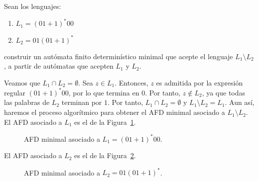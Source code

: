 \begin{ejercicio}\label{ej:1.3.15}
    Sean los lenguajes:
    \begin{enumerate}
        \item $L_1={(01+1)}^{\ast}00$
        \item $L_2=01{(01+1)}^{\ast}$
    \end{enumerate}
    construir un autómata finito determinístico minimal que acepte el lenguaje $L_1 \setminus L_2$, a partir de autómatas que acepten $L_1$ y $L_2$.

    Veamos que $L_1\cap L_2=\emptyset$. Sea $z\in L_1$. Entonces, $z$ es admitida por la expresión regular $(01+1)^{\ast}00$, por lo que termina en $0$. Por tanto, $z\notin L_2$, ya que todas las palabras de $L_2$ terminan por $1$. Por tanto, $L_1\cap L_2=\emptyset$ y $L_1\setminus L_2=L_1$. Aun así, haremos el proceso algorítmico para obtener el AFD minimal asociado a $L_1\setminus L_2$.\\

    El AFD asociado a $L_1$ es el de la Figura~\ref{fig:1.3.15-L1}.
    \begin{figure}
        \centering
        \caption{AFD minimal asociado a $L_1={(01+1)}^{\ast}00$.}
        \label{fig:1.3.15-L1}
    \end{figure}

    El AFD asociado a $L_2$ es el de la Figura~\ref{fig:1.3.15-L2}.
    \begin{figure}
        \centering
        \caption{AFD minimal asociado a $L_2=01{(01+1)}^{\ast}$.}
        \label{fig:1.3.15-L2}
    \end{figure}


\end{ejercicio}
